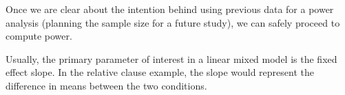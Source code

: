 \documentclass{ar-1col}\usepackage[]{graphicx}\usepackage[]{color}
\begin{document}



Once we are clear about the intention behind using previous data for a power analysis (planning the sample size for a future study), we can safely proceed to compute power. 



Usually, the primary parameter of interest in a linear mixed model is the fixed effect slope. In the relative clause example, the slope would represent  \citep[under an appropriate sum-contrast coding,][]{SchadEtAlcontrasts} the difference in means between the two conditions. 



\end{document}
